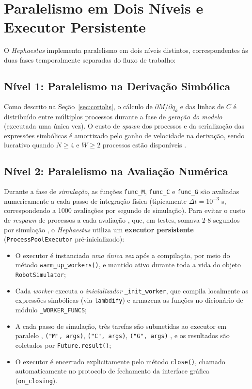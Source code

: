\section{Paralelismo em Dois Níveis e Executor Persistente}
\label{sec:parallel}

O \textit{Hephaestus} implementa paralelismo em dois níveis distintos, correspondentes às duas fases temporalmente separadas do fluxo de trabalho:

\subsection{Nível 1: Paralelismo na Derivação Simbólica}

Como descrito na Seção~\ref{sec:coriolis}, o cálculo de $\partial M/\partial q_k$ e das linhas de $C$ é distribuído entre múltiplos processos durante a fase de \emph{geração do modelo} (executada uma única vez). O custo de \textit{spawn} dos processos e da serialização das expressões simbólicas é amortizado pelo ganho de velocidade na derivação, sendo lucrativo quando $N \geq 4$ e $W \geq 2$ processos estão disponíveis \cite{hollerbach1980recursive, beazley2010understanding}.

\subsection{Nível 2: Paralelismo na Avaliação Numérica}

Durante a fase de \emph{simulação}, as funções \texttt{func\_M}, \texttt{func\_C} e \texttt{func\_G} são avaliadas numericamente a cada passo de integração física (tipicamente $\Delta t = 10^{-3}$ s, correspondendo a 1000 avaliações por segundo de simulação). Para evitar o custo de \textit{respawn} de processos a cada avaliação , que, em testes, somava 2-8 segundos por simulação , o \textit{Hephaestus} utiliza um \textbf{executor persistente} (\texttt{ProcessPoolExecutor} pré-inicializado):

\begin{itemize}
    \item O executor é instanciado \emph{uma única vez} após a compilação, por meio do método \texttt{warm\_up\_workers()}, e mantido ativo durante toda a vida do objeto \texttt{RobotSimulator};
    \item Cada \textit{worker} executa o \textit{inicializador} \texttt{\_init\_worker}, que compila localmente as expressões simbólicas (via \texttt{lambdify}) e armazena as funções no dicionário de módulo \texttt{\_WORKER\_FUNCS};
    \item A cada passo de simulação, três tarefas são submetidas ao executor em paralelo , \texttt{("M", args)}, \texttt{("C", args)}, \texttt{("G", args)} , e os resultados são coletados por \texttt{Future.result()};
    \item O executor é encerrado explicitamente pelo método \texttt{close()}, chamado automaticamente no protocolo de fechamento da interface gráfica (\texttt{on\_closing}).
\end{itemize}

